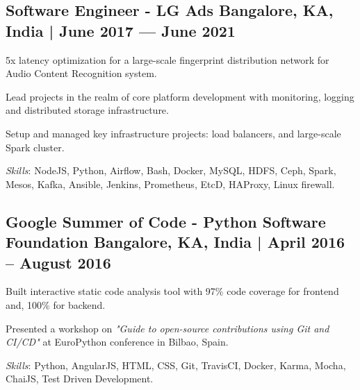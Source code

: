 \subsection{{Software Engineer - LG Ads \hfill Bangalore, KA, India | June 2017 --- June 2021}}
\begin{zitemize}
\item 5x latency optimization for a large-scale fingerprint distribution network for Audio Content Recognition system.
\item Lead projects in the realm of core platform development with monitoring, logging and distributed storage infrastructure. 
\item Setup and managed key infrastructure projects: load balancers, and large-scale Spark cluster.
\end{zitemize}

\textit{Skills}: NodeJS, Python, Airflow, Bash, Docker, MySQL, HDFS, Ceph, Spark, Mesos, Kafka, Ansible, Jenkins, Prometheus, EtcD, HAProxy, Linux firewall.
\vspace*{1mm}

\subsection{{Google Summer of Code - Python Software Foundation \hfill Bangalore, KA, India | April 2016 -- August 2016}}
\begin{zitemize}
\item Built interactive static code analysis tool with 97\% code coverage for frontend and, 100\% for backend.
\item Presented a workshop on \textit{"Guide to open-source contributions using Git and CI/CD"} at EuroPython conference in Bilbao, Spain.
\end{zitemize}
\textit{Skills}: Python, AngularJS, HTML, CSS, Git, TravisCI, Docker, Karma, Mocha, ChaiJS, Test Driven Development.

